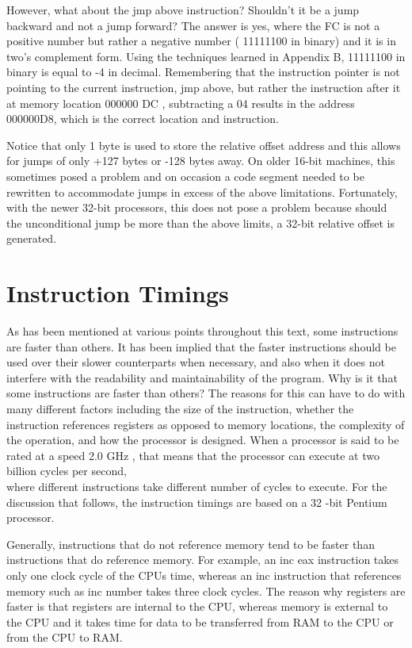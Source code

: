 \documentclass[10pt]{book}
\begin{document}
However, what about the jmp above instruction? Shouldn't it be a jump backward and not a jump forward? The answer is yes, where the FC is not a positive number but rather a negative number ( 11111100 in binary) and it is in two's complement form. Using the techniques learned in Appendix B, 11111100 in binary is equal to -4 in decimal. Remembering that the instruction pointer is not pointing to the current instruction, jmp above, but rather the instruction after it at memory location 000000 DC , subtracting a 04 results in the address 000000D8, which is the correct location and instruction.

Notice that only 1 byte is used to store the relative offset address and this allows for jumps of only +127 bytes or -128 bytes away. On older 16-bit machines, this sometimes posed a problem and on occasion a code segment needed to be rewritten to accommodate jumps in excess of the above limitations. Fortunately, with the newer 32-bit processors, this does not pose a problem because should the unconditional jump be more than the above limits, a 32-bit relative offset is generated.

\section{Instruction Timings}
As has been mentioned at various points throughout this text, some instructions are faster than others. It has been implied that the faster instructions should be used over their slower counterparts when necessary, and also when it does not interfere with the readability and maintainability of the program. Why is it that some instructions are faster than others? The reasons for this can have to do with many different factors including the size of the instruction, whether the instruction references registers as opposed to memory locations, the complexity of the operation, and how the processor is designed. When a processor is said to be rated at a speed 2.0 GHz , that means that the processor can execute at two billion cycles per second,\\
where different instructions take different number of cycles to execute. For the discussion that follows, the instruction timings are based on a 32 -bit Pentium processor.


Generally, instructions that do not reference memory tend to be faster than instructions that do reference memory. For example, an inc eax instruction takes only one clock cycle of the CPUs time, whereas an inc instruction that references memory such as inc number takes three clock cycles. The reason why registers are faster is that registers are internal to the CPU, whereas memory is external to the CPU and it takes time for data to be transferred from RAM to the CPU or from the CPU to RAM.
\end{document}
